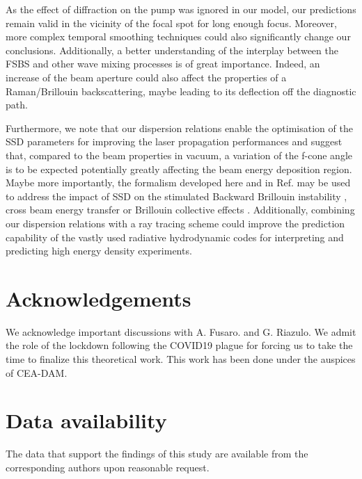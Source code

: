 \documentclass[
 reprint,
 amsmath,amssymb,
 aps,
]{revtex4-1}
\begin{document}
As the effect of diffraction on the pump was ignored in our model, our predictions remain valid in the vicinity of the focal spot  for long enough focus. Moreover, more complex temporal smoothing techniques could also significantly change our conclusions.
Additionally, a  better understanding of the interplay between the FSBS and other wave mixing processes is of great importance. Indeed,  an increase of the beam aperture could also affect the properties of a Raman/Brillouin backscattering, maybe leading  to its  deflection  off the diagnostic path. 

Furthermore, we note that our dispersion relations enable the optimisation of the SSD parameters for improving the laser propagation performances and suggest that, compared to the beam properties in vacuum,  a variation of the f-cone angle is to be expected  potentially greatly  affecting the beam energy deposition region. 
Maybe more importantly, the formalism  developed here and in Ref. \cite[]{POP_Ruyer_2021}  may be used to address the impact of SSD on the stimulated   Backward Brillouin instability  \cite[]{POP_Duluc_2019}, cross beam energy transfer \cite[]{PRL_Neuville_2016cbet} or Brillouin collective effects \cite[]{PFB_Dubois_1992,POP_Xiao_2019}. 
Additionally, combining our dispersion relations with   a ray tracing scheme \cite[]{Strozzi_2017,POP_Debayle_2019} could improve the prediction capability of the vastly used radiative hydrodynamic codes for interpreting and predicting   high energy density experiments.

\section*{Acknowledgements}
We acknowledge important discussions with A. Fusaro. and G. Riazulo. 
We  admit the role of the lockdown following the COVID19 plague for forcing us to take the time to finalize this theoretical work. This work has been done under the auspices of CEA-DAM. 

\section*{Data availability}
The data that support the findings of this study are available from the corresponding authors upon reasonable request.


\end{document}
